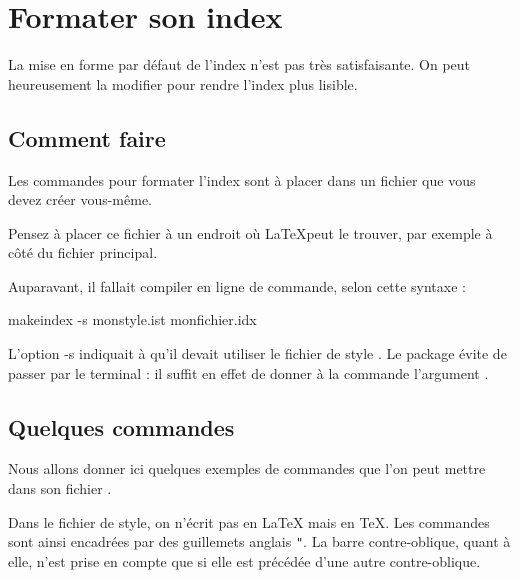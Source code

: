 \chapter{Formater son index}\label{styleindex}

\begin{intro}
La mise en forme par défaut de l'index n'est pas très satisfaisante. On peut heureusement la modifier pour rendre l'index plus lisible.
\end{intro}

\section{Comment faire}
Les commandes pour formater l'index sont à placer dans un fichier  que vous devez créer vous-même.

\begin{attention}
Pensez à placer ce fichier à un endroit où \LaTeX peut le trouver, par exemple à côté du fichier principal.
\end{attention}

Auparavant, il fallait compiler en ligne de commande, selon cette syntaxe :

\begin{bashcode}
makeindex -s monstyle.ist monfichier.idx
\end{bashcode}

L'option -s indiquait  à   qu'il devait utiliser le fichier de style .
Le package   évite de passer par le terminal : il suffit en effet de  donner à la commande  l'argument . 



\section{Quelques commandes}

Nous allons donner ici quelques exemples de commandes que l'on peut mettre dans son fichier . 

\begin{attention}
Dans le fichier de style, on n'écrit pas en \LaTeX{} mais en \TeX . Les commandes sont ainsi encadrées par des guillemets anglais \verb|"|. La barre contre-oblique, quant à elle, n'est prise en compte que si elle est précédée d'une autre contre-oblique.
\end{attention}

